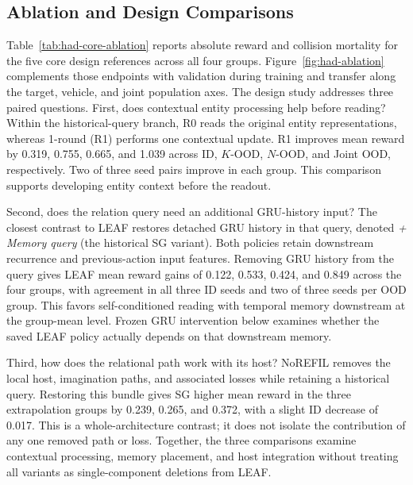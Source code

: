 \subsection{Ablation and Design Comparisons}
\label{subsec:ablation}
Table~\ref{tab:had-core-ablation} reports absolute reward and collision mortality for the five core design references across all four groups. Figure~\ref{fig:had-ablation} complements those endpoints with validation during training and transfer along the target, vehicle, and joint population axes. The design study addresses three paired questions. First, does contextual entity processing help before reading? Within the historical-query branch, R0 reads the original entity representations, whereas 1-round (R1) performs one contextual update. R1 improves mean reward by 0.319, 0.755, 0.665, and 1.039 across ID, $K$-OOD, $N$-OOD, and Joint OOD, respectively. Two of three seed pairs improve in each group. This comparison supports developing entity context before the readout.

Second, does the relation query need an additional GRU-history input? The closest contrast to LEAF restores detached GRU history in that query, denoted \emph{+ Memory query} (the historical SG variant). Both policies retain downstream recurrence and previous-action input features. Removing GRU history from the query gives LEAF mean reward gains of 0.122, 0.533, 0.424, and 0.849 across the four groups, with agreement in all three ID seeds and two of three seeds per OOD group. This favors self-conditioned reading with temporal memory downstream at the group-mean level. Frozen GRU intervention below examines whether the saved LEAF policy actually depends on that downstream memory.

Third, how does the relational path work with its host? NoREFIL removes the local host, imagination paths, and associated losses while retaining a historical query. Restoring this bundle gives SG higher mean reward in the three extrapolation groups by 0.239, 0.265, and 0.372, with a slight ID decrease of 0.017. This is a whole-architecture contrast; it does not isolate the contribution of any one removed path or loss. Together, the three comparisons examine contextual processing, memory placement, and host integration without treating all variants as single-component deletions from LEAF.

\HadCoreAblationTable

